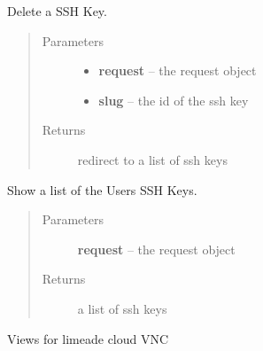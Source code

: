 \documentclass[letterpaper,10pt,english]{sphinxmanual}
\begin{document}
\begin{fulllineitems}
\label{api/cloud:limeade.cloud.views.ssh.sshkey_delete}
Delete a SSH Key.
\begin{quote}\begin{description}
\item[{Parameters}] \leavevmode\begin{itemize}
\item {} 
\textbf{request} -- the request object

\item {} 
\textbf{slug} -- the id of the ssh key

\end{itemize}

\item[{Returns}] \leavevmode
redirect to a list of ssh keys

\end{description}\end{quote}

\end{fulllineitems}


\begin{fulllineitems}
\label{api/cloud:limeade.cloud.views.ssh.sshkey_list}
Show a list of the Users SSH Keys.
\begin{quote}\begin{description}
\item[{Parameters}] \leavevmode
\textbf{request} -- the request object

\item[{Returns}] \leavevmode
a list of ssh keys

\end{description}\end{quote}

\end{fulllineitems}

\label{api/cloud:module-limeade.cloud.views.vnc}
Views for limeade cloud VNC
\end{document}
